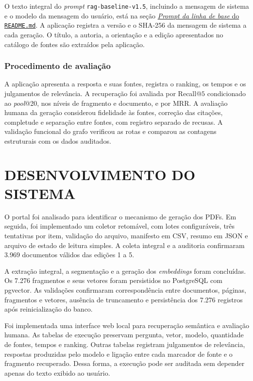 O texto integral do \textit{prompt} \texttt{rag-baseline-v1.5}, incluindo a mensagem de sistema e o modelo da mensagem do usuário, está na seção \href{https://github.com/BrenoPiropo/tcc_rag/blob/main/README.md\#prompt-da-linha-de-base}{\textit{Prompt da linha de base} do \texttt{README.md}}. A aplicação registra a versão e o SHA-256 da mensagem de sistema a cada geração. O título, a autoria, a orientação e a edição apresentados no catálogo de fontes são extraídos pela aplicação.

\subsection{Procedimento de avaliação}

A aplicação apresenta a resposta e suas fontes, registra o ranking, os tempos e os julgamentos de relevância. A recuperação foi avaliada por Recall@$5$ condicionado ao \textit{pool}@20, nos níveis de fragmento e documento, e por MRR. A avaliação humana da geração considerou fidelidade às fontes, correção das citações, completude e separação entre fontes, com registro separado de recusas. A validação funcional do grafo verificou as rotas e comparou as contagens estruturais com os dados auditados.

\chapter{DESENVOLVIMENTO DO SISTEMA}

O portal foi analisado para identificar o mecanismo de geração dos PDFs. Em seguida, foi implementado um coletor retomável, com lotes configuráveis, três tentativas por item, validação do arquivo, manifesto em CSV, resumo em JSON e arquivo de estado de leitura simples. A coleta integral e a auditoria confirmaram 3.969 documentos válidos das edições 1 a 5.

A extração integral, a segmentação e a geração dos \textit{embeddings} foram concluídas. Os 7.276 fragmentos e seus vetores foram persistidos no PostgreSQL com pgvector. As validações confirmaram correspondência entre documentos, páginas, fragmentos e vetores, ausência de truncamento e persistência dos 7.276 registros após reinicialização do banco.

Foi implementada uma interface web local para recuperação semântica e avaliação humana. As tabelas de execução preservam pergunta, vetor, modelo, quantidade de fontes, tempos e ranking. Outras tabelas registram julgamentos de relevância, respostas produzidas pelo modelo e ligação entre cada marcador de fonte e o fragmento recuperado. Dessa forma, a execução pode ser auditada sem depender apenas do texto exibido ao usuário.

